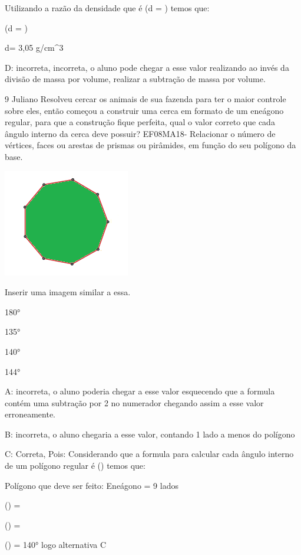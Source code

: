 Utilizando a razão da densidade que é (d = ) temos que:

(d = )

d= 3,05 g/cm^3

D: incorreta, incorreta, o aluno pode chegar a esse valor realizando ao
invés da divisão de massa por volume, realizar a subtração de massa por
volume.

\num{9} Juliano Resolveu cercar os animais de sua fazenda para ter o maior
controle sobre eles, então começou a construir uma cerca em formato de
um eneágono regular, para que a construção fique perfeita, qual o valor
correto que cada ângulo interno da cerca deve possuir? EF08MA18-
Relacionar o número de vértices, faces ou arestas de prismas ou
pirâmides, em função do seu polígono da base.

\includegraphics[width=1\times 575in,height=1\times 33385in]{./imgSAEB_8_MAT/media/image60.png}

Inserir uma imagem similar a essa.

\item 180°
\item 135°
\item 140°
\item 144°

A: incorreta, o aluno poderia chegar a esse valor esquecendo que a
formula contém uma subtração por 2 no numerador chegando assim a esse
valor erroneamente.

B: incorreta, o aluno chegaria a esse valor, contando 1 lado a menos do
polígono

C: Correta, Pois: Considerando que a formula para calcular cada ângulo
interno de um polígono regular é
() temos que:

Polígono que deve ser feito: Eneágono = 9 lados

() =

() =

() = 140° logo alternativa C

